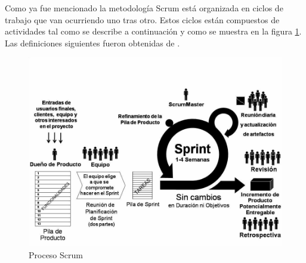 Como ya fue mencionado la metodología Scrum está organizada en ciclos de trabajo que van ocurriendo uno tras otro. Estos ciclos están compuestos de actividades tal como se describe a continuación y como se muestra en la figura \ref{fig:scrum}. Las definiciones siguientes fueron obtenidas de \cite{DBLV09}.

\begin{figure}[h]
	\begin{center}
		\includegraphics[scale=0.4]{imagenes/scrum.png}
	\end{center}
	\caption{
		\label{fig:scrum}
		Proceso Scrum \cite{DBLV09}
	}
\end{figure}

